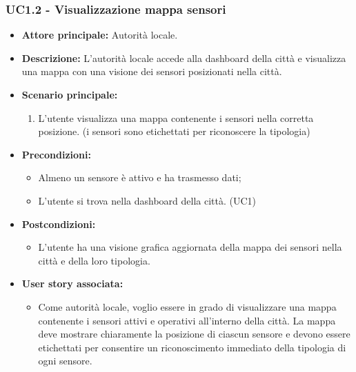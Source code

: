 \subsubsection{UC1.2 - Visualizzazione mappa sensori}
\begin{itemize}
    \item \textbf{Attore principale:} Autorità locale.
    \item \textbf{Descrizione:} L'autorità locale accede alla dashboard della città e visualizza una mappa con una visione dei sensori posizionati nella città.
    \item \textbf{Scenario principale:}
          \begin{enumerate}
              \item L'utente visualizza una mappa contenente i sensori nella corretta posizione. (i sensori sono etichettati per riconoscere la tipologia)
          \end{enumerate}
    \item \textbf{Precondizioni:}
          \begin{itemize}
              \item  Almeno un sensore è attivo e ha trasmesso dati;
              \item L'utente si trova nella dashboard della città. (UC1)
          \end{itemize}
    \item \textbf{Postcondizioni:}
          \begin{itemize}
              \item      L'utente ha una visione grafica aggiornata della mappa dei sensori nella città e della loro tipologia.
          \end{itemize}
    \item \textbf{User story associata:}
          \begin{itemize}
              \item Come autorità locale, voglio essere in grado di visualizzare una mappa contenente i sensori attivi e operativi all'interno della città. La mappa deve mostrare chiaramente la posizione di ciascun sensore e devono essere etichettati per consentire un riconoscimento immediato della tipologia di ogni sensore.
          \end{itemize}
\end{itemize}